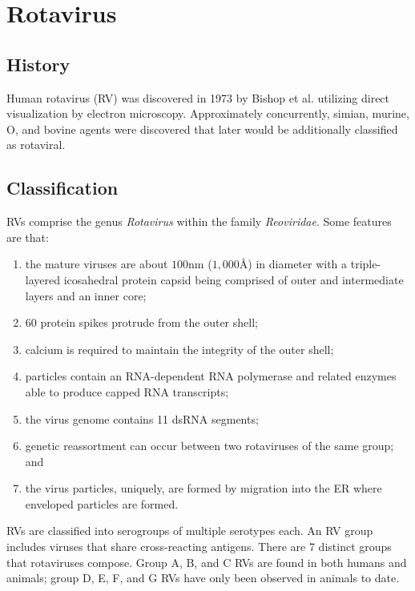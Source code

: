 
\section{Rotavirus}

\subsection{History}

Human rotavirus (RV) was discovered in 1973 by Bishop et al. utilizing direct visualization by electron microscopy. Approximately concurrently, simian, murine, O, and bovine agents were discovered that later would be additionally classified as rotaviral.

\subsection{Classification}

RVs comprise the genus \textit{Rotavirus} within the family \textit{Reoviridae}. Some features are that:

\begin{enumerate}
	\item the mature viruses are about $100$nm ($1,000$\AA) in diameter with a triple-layered icosahedral protein capsid being comprised of outer and intermediate layers and an inner core;
	\item 60 protein spikes protrude from the outer shell;
	\item calcium is required to maintain the integrity of the outer shell;
	\item particles contain an RNA-dependent RNA polymerase and related enzymes able to produce capped RNA transcripts;
	\item the virus genome contains 11 dsRNA segments;
	\item genetic reassortment can occur between two rotaviruses of the same group; and
	\item the virus particles, uniquely, are formed by migration into the ER where enveloped particles are formed.
\end{enumerate}

RVs are classified into serogroups of multiple serotypes each. An RV group includes viruses that share cross-reacting antigens. There are 7 distinct groups that rotaviruses compose. Group A, B, and C RVs are found in both humans and animals; group D, E, F, and G RVs have only been observed in animals to date.

